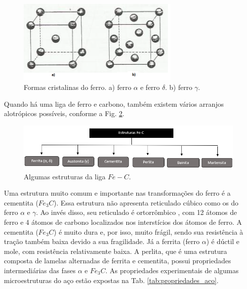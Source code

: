 \documentclass[
12pt,
openany, %
oneside, %
a4paper,			
english,			
brazil			        %
]{abntbibufjf}
\begin{document}
	\begin{figure}[H]
		\centering
		\includegraphics[width=0.7\textwidth]{ccc_cfc}
		\caption{Formas cristalinas do ferro. a) ferro $\alpha$ e ferro $\delta$. b) ferro $\gamma$. \cite{chiaverini2003tratamentos}}
		\label{fig:ccc_cfc}
	\end{figure}
	
	Quando há uma liga de ferro e carbono, também existem vários arranjos alotrópicos possíveis, conforme a Fig. \ref{fig:alotropia}. 
	
	\begin{figure}[H]
		\centering
		\includegraphics[width=1\textwidth]{alotropia}
		\caption{Algumas estruturas da liga $Fe-C$.}
		\label{fig:alotropia}
	\end{figure}

	Uma estrutura muito comum e importante nas transformações do ferro é a cementita ($Fe_3C$). Essa estrutura não apresenta reticulado cúbico como os do ferro $\alpha$ e $\gamma$. Ao invés disso, seu reticulado é ortorrômbico \cite{chiaverini2003tratamentos}, com 12 átomos de ferro e 4 átomos de carbono localizados nos interstícios dos átomos de ferro. A cementita ($Fe_3C$) é muito dura e, por isso, muito frágil, sendo sua resistência à tração também baixa devido a sua fragilidade. Já a ferrita (ferro $\alpha$) é dúctil e mole, com resistência relativamente baixa. A perlita, que é uma estrutura composta de lamelas alternadas de ferrita e cementita, possui propriedades intermediárias das fases $\alpha$ e $Fe_3C$. As propriedades experimentais de algumas microestruturas do aço estão expostas na Tab. \ref{tab:propriedades_aco}.
	
\end{document}
